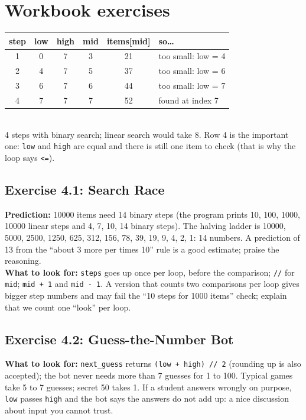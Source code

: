 
\section{Workbook exercises}
\begin{answer}
\begin{tabular}{@{}cccccl@{}}
\toprule
step & low & high & mid & items[mid] & so\ldots \\ \midrule
1 & 0 & 7 & 3 & 21 & too small: low = 4 \\
2 & 4 & 7 & 5 & 37 & too small: low = 6 \\
3 & 6 & 7 & 6 & 44 & too small: low = 7 \\
4 & 7 & 7 & 7 & 52 & found at index 7 \\
\bottomrule
\end{tabular}\\[4pt]
4 steps with binary search; linear search would take 8. Row 4 is the important one: \texttt{low} and \texttt{high} are equal and there is still one item to check (that is why the loop says \texttt{<=}).
\end{answer}

\subsection{Exercise 4.1: Search Race}
\begin{answer}
\textbf{Prediction:} 10000 items need 14 binary steps (the program prints 10, 100, 1000, 10000 linear steps and 4, 7, 10, 14 binary steps). The halving ladder is 10000, 5000, 2500, 1250, 625, 312, 156, 78, 39, 19, 9, 4, 2, 1: 14 numbers. A prediction of 13 from the \enquote{about 3 more per times 10} rule is a good estimate; praise the reasoning.\\
\textbf{What to look for:} \texttt{steps} goes up once per loop, before the comparison; \texttt{//} for \texttt{mid}; \texttt{mid + 1} and \texttt{mid - 1}.
A version that counts two comparisons per loop gives bigger step numbers and may fail the \enquote{10 steps for 1000 items} check; explain that we count one \enquote{look} per loop.
\end{answer}

\subsection{Exercise 4.2: Guess-the-Number Bot}
\begin{answer}
\textbf{What to look for:} \texttt{next\_guess} returns \texttt{(low + high) // 2} (rounding up is also accepted); the bot never needs more than 7 guesses for 1 to 100. Typical games take 5 to 7 guesses; secret 50 takes 1.
If a student answers wrongly on purpose, \texttt{low} passes \texttt{high} and the bot says the answers do not add up: a nice discussion about input you cannot trust.
\end{answer}

